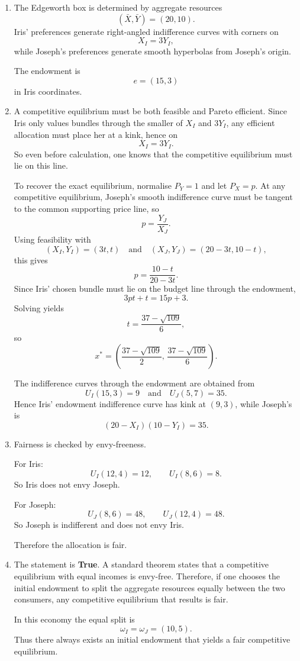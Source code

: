 \documentclass[12pt]{article}
\begin{document}
\begin{enumerate}[label=(\alph*)]
    \item
    The Edgeworth box is determined by aggregate resources
    \[
    (\bar X,\bar Y)=(20,10).
    \]
    Iris' preferences generate right-angled indifference curves with corners on
    \[
    X_I=3Y_I,
    \]
    while Joseph's preferences generate smooth hyperbolas from Joseph's origin.

    The endowment is
    \[
    e=(15,3)
    \]
    in Iris coordinates.

    \item
    A competitive equilibrium must be both feasible and Pareto efficient. Since Iris only values bundles through the smaller of \(X_I\) and \(3Y_I\), any efficient allocation must place her at a kink, hence on
    \[
    X_I=3Y_I.
    \]
    So even before calculation, one knows that the competitive equilibrium must lie on this line.

    To recover the exact equilibrium, normalise \(P_Y=1\) and let \(P_X=p\). At any competitive equilibrium, Joseph's smooth indifference curve must be tangent to the common supporting price line, so
    \[
    p=\frac{Y_J}{X_J}.
    \]
    Using feasibility with
    \[
    (X_I,Y_I)=(3t,t)
    \quad\text{and}\quad
    (X_J,Y_J)=(20-3t,10-t),
    \]
    this gives
    \[
    p=\frac{10-t}{20-3t}.
    \]
    Since Iris' chosen bundle must lie on the budget line through the endowment,
    \[
    3pt+t=15p+3.
    \]
    Solving yields
    \[
    t=\frac{37-\sqrt{109}}{6},
    \]
    so
    \[
    x^*=
    \left(\frac{37-\sqrt{109}}{2},\,\frac{37-\sqrt{109}}{6}\right).
    \]

    The indifference curves through the endowment are obtained from
    \[
    U_I(15,3)=9
    \quad\text{and}\quad
    U_J(5,7)=35.
    \]
    Hence Iris' endowment indifference curve has kink at \((9,3)\), while Joseph's is
    \[
    (20-X_I)(10-Y_I)=35.
    \]

    \item
    Fairness is checked by envy-freeness.

    For Iris:
    \[
    U_I(12,4)=12,
    \qquad
    U_I(8,6)=8.
    \]
    So Iris does not envy Joseph.

    For Joseph:
    \[
    U_J(8,6)=48,
    \qquad
    U_J(12,4)=48.
    \]
    So Joseph is indifferent and does not envy Iris.

    Therefore the allocation is fair.

    \item
    The statement is \textbf{True}. A standard theorem states that a competitive equilibrium with equal incomes is envy-free. Therefore, if one chooses the initial endowment to split the aggregate resources equally between the two consumers, any competitive equilibrium that results is fair.

    In this economy the equal split is
    \[
    \omega_I=\omega_J=(10,5).
    \]
    Thus there always exists an initial endowment that yields a fair competitive equilibrium.
\end{enumerate}
\vspace{3cm}
\end{document}
